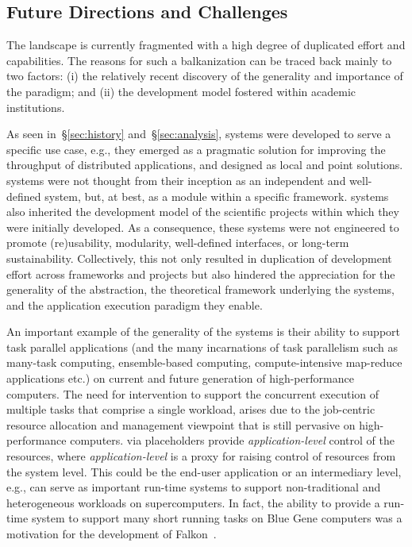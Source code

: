 \documentclass{sig-alternate}
\begin{document}


%
\subsection{Future Directions and Challenges}
\label{sec:future}

The \pilot landscape is currently fragmented with a high degree of duplicated
effort and capabilities. The reasons for such a balkanization can be traced back
mainly to two factors: (i) the relatively recent discovery of the generality and
importance of the \pilot paradigm; and (ii) the development model fostered
within academic institutions.

As seen in~\S\ref{sec:history} and~\S\ref{sec:analysis}, \pilot systems were
developed to serve a specific use case, e.g., they emerged as a pragmatic
solution for improving the throughput of distributed applications, and designed
as local and point solutions. \pilot systems were not thought from their
inception as an independent and well-defined system, but, at best, as a module
within a specific framework. \pilot systems also inherited the development model
of the scientific projects within which they were initially developed. As a
consequence, these systems were not engineered to promote (re)usability,
modularity, well-defined interfaces, or long-term sustainability. Collectively,
this not only resulted in duplication of development effort across frameworks
and projects but also hindered the appreciation for the generality of the \pilot
abstraction, the theoretical framework underlying the \pilot systems, and the
application execution paradigm they enable.

An important example of the generality of the \pilot systems is their ability to
support task parallel applications (and the many incarnations of task
parallelism such as many-task computing, ensemble-based computing,
compute-intensive map-reduce applications etc.) on current and future generation
of high-performance computers. The need for intervention to support the
concurrent execution of multiple tasks that comprise a single workload, arises
due to the job-centric resource allocation and management viewpoint that is
still pervasive on high-performance computers. \pilots via placeholders provide
{\it application-level} control of the resources, where {\it application-level}
is a proxy for raising control of resources from the system level. This could be
the end-user application or an intermediary level, e.g., \pilots can
serve as important run-time systems to support non-traditional and heterogeneous
workloads on supercomputers.  In fact, the ability to provide a run-time system
to support many short running tasks on Blue Gene computers was a motivation for
the development of Falkon~\cite{raicu2007}.
\end{document}
